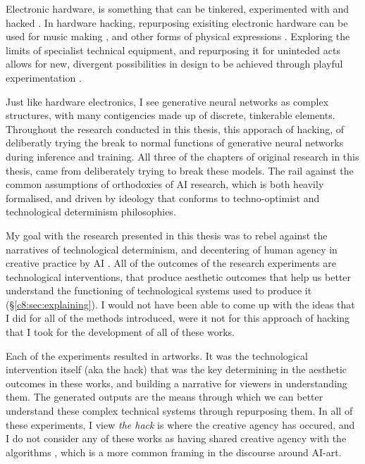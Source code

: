 Electronic hardware, is something that can be tinkered, experimented with and hacked \citep{collins2004hardware, grand2004hardware}. 
In hardware hacking, repurposing exisiting electronic hardware can be used for music making \citep{collins2009handmade}, and other forms of physical expressions \citep{hartmann2008hacking}.
Exploring the limits of specialist technical equipment, and repurposing it for uninteded acts allows for new, divergent possibilities in design to be achieved through playful experimentation \citep{goddard2015playful}.

Just like hardware electronics, I see generative neural networks as complex structures, with many contigencies made up of discrete, tinkerable elements.
Throughout the research conducted in this thesis, this apporach of hacking, of deliberatly trying the break to normal functions of generative neural networks during inference and training. 
All three of the chapters of original research in this thesis, came from deliberately trying to break these models.
The rail against the common assumptions of orthodoxies of AI research, which is both heavily formalised, and driven by ideology \citep{sias2021ideology} that conforms to techno-optimist \citep{andreesen2023techno} and technological determinism \citep{drew2016technological} philosophies. 

My goal with the research presented in this thesis was to rebel against the narratives of technological determinism, and decentering of human agency in creative practice by AI \citep{zeilinger2021tactical}.
All of the outcomes of the research experiments are technological interventions, that produce aesthetic outcomes that help us better understand the functioning of technological systems used to produce it (\S \ref{c8:sec:explaining}). 
I would not have been able to come up with the ideas that I did for all of the methods introduced, were it not for this approach of hacking that I took for the development of all of these works.

Each of the experiments resulted in artworks.
It was the technological intervention itself (aka the hack) that was the key determining in the aesthetic outcomes in these works, and building a narrative for viewers in understanding them.
The generated outputs are the means through which we can better understand these complex technical systems through repurposing them.
In all of these experiments, I view \textit{the hack} is where the creative agency has occured, and I do not consider any of these works as having shared creative agency with the algorithms \citep{moruzzi2022creative}, which is a more common framing in the discourse around AI-art.

